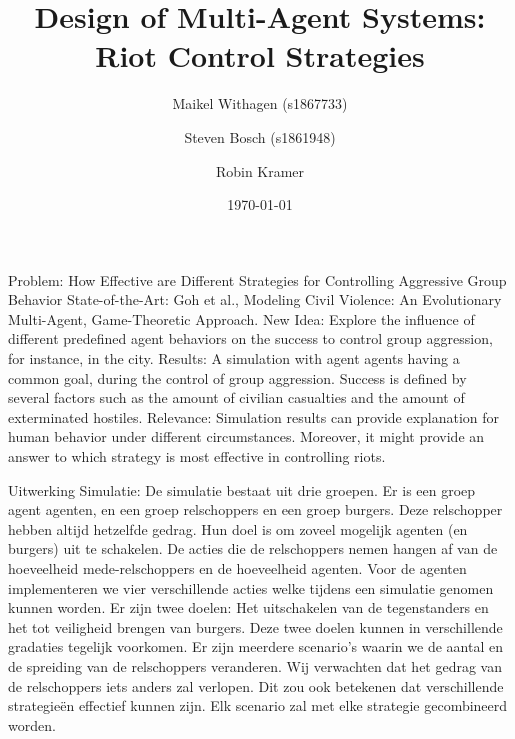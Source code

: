 \documentclass[11pt,a4paper]{article}
\title{Design of Multi-Agent Systems: Riot Control Strategies}
\author{Maikel Withagen (s1867733) \and Steven Bosch (s1861948) \and Robin Kramer}
\date{\today}
\begin{document}
	\maketitle
	
	\section{}	
		Problem: How Effective are Different Strategies for Controlling Aggressive Group Behavior
		State-of-the-Art: Goh et al., Modeling Civil Violence: An Evolutionary Multi-Agent, Game-Theoretic Approach.
		New Idea: Explore the influence of different predefined agent behaviors on the success to control group aggression, for instance, in the city. 
		Results: A simulation with agent agents having a common goal, during  the control of group aggression. Success is defined by several factors such as the amount of civilian casualties and the amount of exterminated hostiles.
		Relevance: Simulation results can provide explanation for human behavior under different circumstances. Moreover, it might provide an answer to which strategy is most effective in controlling riots. 
		
		
		Uitwerking Simulatie:
		De simulatie bestaat uit drie groepen. Er is een groep agent agenten, en een groep relschoppers en een groep burgers. Deze relschopper hebben altijd hetzelfde gedrag. Hun doel is om zoveel mogelijk agenten (en burgers) uit te schakelen. De acties die de relschoppers nemen hangen af van de hoeveelheid mede-relschoppers en de hoeveelheid agenten. 
		Voor de agenten implementeren we vier verschillende acties welke tijdens een simulatie genomen kunnen worden. Er zijn twee doelen: Het uitschakelen van de tegenstanders en het tot veiligheid brengen van burgers. Deze twee doelen kunnen in verschillende gradaties tegelijk voorkomen.  
		Er zijn meerdere scenario’s waarin we de aantal en de spreiding van de relschoppers veranderen. Wij verwachten dat het gedrag van de relschoppers iets anders zal verlopen. Dit zou ook betekenen dat verschillende strategieën effectief kunnen zijn. Elk scenario zal met elke strategie gecombineerd worden. 
\end{document}
